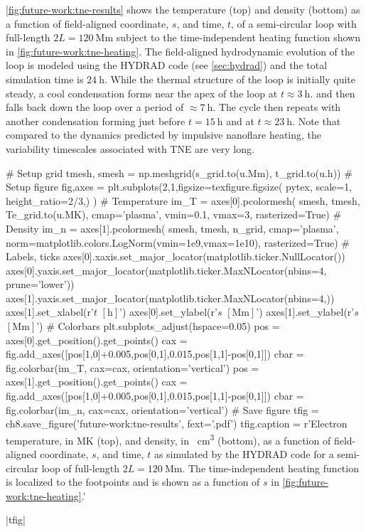 \autoref{fig:future-work:tne-results} shows the temperature (top) and density (bottom) as a function of field-aligned coordinate, $s$, and time, $t$, of a semi-circular loop with full-length $2L=\SI{120}{\mega\m}$ subject to the time-independent heating function shown in \autoref{fig:future-work:tne-heating}. The field-aligned hydrodynamic evolution of the loop is modeled using the HYDRAD code (see \autoref{sec:hydrad}) and the total simulation time is $\SI{24}{\hour}$. While the thermal structure of the loop is initially quite steady, a cool condensation forms near the apex of the loop at $t\approx\SI{3}{\hour}$. and then falls back down the loop over a period of $\approx\SI{7}{\hour}$. The cycle then repeats with another condensation forming just before $t=\SI{15}{\hour}$ and at $t\approx\SI{23}{\hour}$. Note that compared to the dynamics predicted by impulsive nanoflare heating, the variability timescales associated with TNE are very long. 

\begin{pycode}[chapter8]
# Setup grid
tmesh, smesh = np.meshgrid(s_grid.to(u.Mm), t_grid.to(u.h))
# Setup figure
fig,axes = plt.subplots(2,1,figsize=texfigure.figsize(
    pytex,
    scale=1,
    height_ratio=2/3,)
)
# Temperature
im_T = axes[0].pcolormesh(
    smesh, tmesh, Te_grid.to(u.MK),
    cmap='plasma',
    vmin=0.1,
    vmax=3,
    rasterized=True)
# Density
im_n = axes[1].pcolormesh(
    smesh, tmesh, n_grid,
    cmap='plasma',
    norm=matplotlib.colors.LogNorm(vmin=1e9,vmax=1e10),
    rasterized=True)
# Labels, ticks
axes[0].xaxis.set_major_locator(matplotlib.ticker.NullLocator())
axes[0].yaxis.set_major_locator(matplotlib.ticker.MaxNLocator(nbins=4, prune='lower'))
axes[1].yaxis.set_major_locator(matplotlib.ticker.MaxNLocator(nbins=4,))
axes[1].set_xlabel(r'$t$ $[\si{\hour}]$')
axes[0].set_ylabel(r'$s$ $[\si{\mega\m}]$')
axes[1].set_ylabel(r'$s$ $[\si{\mega\m}]$')
# Colorbars
plt.subplots_adjust(hspace=0.05)
pos = axes[0].get_position().get_points()
cax = fig.add_axes([pos[1,0]+0.005,pos[0,1],0.015,pos[1,1]-pos[0,1]])
cbar = fig.colorbar(im_T, cax=cax, orientation='vertical')
pos = axes[1].get_position().get_points()
cax = fig.add_axes([pos[1,0]+0.005,pos[0,1],0.015,pos[1,1]-pos[0,1]])
cbar = fig.colorbar(im_n, cax=cax, orientation='vertical')
# Save figure
tfig = ch8.save_figure('future-work:tne-results', fext='.pdf')
tfig.caption = r'Electron temperature, in \si{\mega\kelvin} (top), and density, in \si{\per\cubic\cm} (bottom), as a function of field-aligned coordinate, $s$, and time, $t$ as simulated by the HYDRAD code for a semi-circular loop of full-length $2L=\SI{120}{\mega\m}$. The time-independent heating function is localized to the footpoints and is shown as a function of $s$ in \autoref{fig:future-work:tne-heating}.'
\end{pycode}
\py[chapter8]|tfig|

